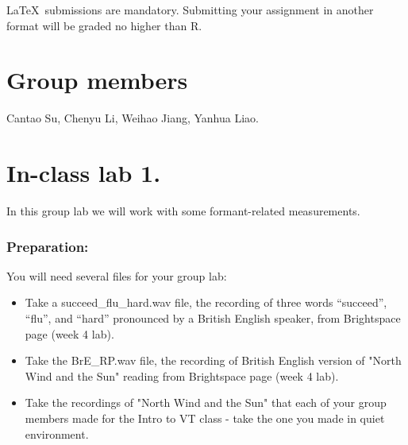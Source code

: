 \documentclass{../labbook}
\begin{document}
\begin{mdframed}[backgroundcolor=blue!20]
\LaTeX ~submissions are mandatory. Submitting your assignment in another format will be graded no higher than R.
\end{mdframed}

\section{Group members}
Cantao Su, Chenyu Li, Weihao Jiang, Yanhua Liao.

\section{In-class lab 1.}
In this group lab we will work with some formant-related measurements.

\subsubsection*{Preparation:}
You will need several files for your group lab:
\begin{itemize}
    \item Take a succeed\_flu\_hard.wav file, the recording of three words ``succeed'', ``flu'', and ``hard'' pronounced by a British English speaker, from Brightspace page (week 4 lab).
    \item Take the BrE\_RP.wav file, the recording of British English version of "North Wind and the Sun" reading from Brightspace page (week 4 lab).
    \item Take the recordings of "North Wind and the Sun" that each of your group members made for the Intro to VT class - take the one you made in quiet environment. 
\end{itemize}
\end{document}
